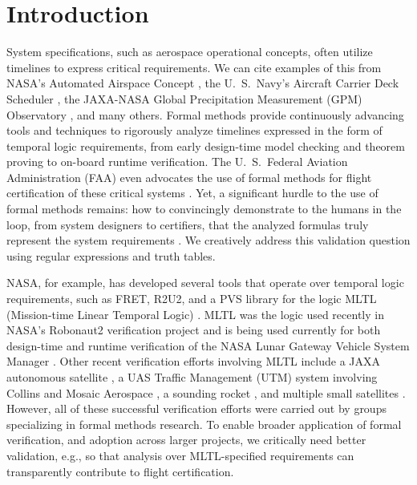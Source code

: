 \documentclass[runningheads]{llncs}
\begin{document}
\vspace{-0.4in}
\section{Introduction}
\vspace{-0.1in}
System specifications, such as aerospace operational concepts, often utilize timelines to express critical requirements. We can cite examples of this from NASA's Automated Airspace Concept \cite{EH10}, the U.~S.~Navy's Aircraft Carrier Deck Scheduler \cite{RCRBS11}, the JAXA-NASA Global Precipitation Measurement (GPM) Observatory \cite{GPM}, and many others. Formal methods provide continuously advancing tools and techniques to rigorously analyze timelines expressed in the form of temporal logic requirements, from early design-time model checking and theorem proving to on-board runtime verification. The U.~S.~Federal Aviation Administration (FAA) even advocates the use of formal methods for flight certification of these critical systems \cite{DO-178C,DO-254,DO-333}. Yet, a significant hurdle to the use of formal methods remains: how to convincingly demonstrate to the humans in the loop, from system designers to certifiers, that the analyzed formulas truly represent the system requirements \cite{Roz16}. We creatively address this validation question using regular expressions and truth tables.

NASA, for example, has developed several tools that operate over temporal logic requirements, such as FRET\cite{GMRPSS20}, R2U2\cite{RS17}, and a PVS library \cite{CTGPD22} for the logic MLTL (Mission-time Linear Temporal Logic) \cite{RRS14,LVR22}. MLTL was the logic used recently in NASA's Robonaut2 verification project \cite{KZJZR20} and is being used currently for both design-time and runtime verification of the NASA Lunar Gateway Vehicle System Manager \cite{DBR21}. Other recent verification %
efforts involving MLTL include a JAXA autonomous satellite \cite{JAXA}, a UAS Traffic Management (UTM) system involving Collins and Mosaic Aerospace \cite{HCHJR21}, a sounding rocket \cite{HLR21}, and multiple small satellites \cite{LLR21,LJBHCLR22,AJR22}. However, all of these successful verification efforts were carried out by groups specializing in formal methods research. To enable broader application of formal verification, and adoption across larger projects, we critically need better validation, e.g., so that analysis over MLTL-specified requirements can transparently contribute to flight certification. 
\end{document}
